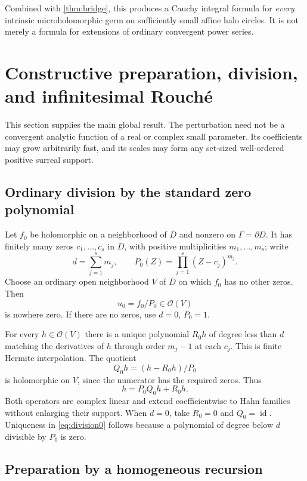 \documentclass[11pt,letterpaper]{article}
\numberwithin{equation}{section}
\theoremstyle{definition}
\theoremstyle{remark}
\newcommand{\OO}{\mathcal O}
\DeclareMathOperator{\id}{id}
\begin{document}
Combined with \cref{thm:bridge}, this produces a Cauchy integral formula
for \emph{every} intrinsic microholomorphic germ on sufficiently small
affine halo circles. It is not merely a formula for extensions of
ordinary convergent power series.

\section{Constructive preparation, division, and infinitesimal Rouch\'e}
\label{sec:preparation}

This section supplies the main global result. The perturbation need not
be a convergent analytic function of a real or complex small parameter.
Its coefficients may grow arbitrarily fast, and its scales may form any
set-sized well-ordered positive surreal support.

\subsection{Ordinary division by the standard zero polynomial}

Let $f_0$ be holomorphic on a neighborhood of $\overline D$ and nonzero
on $\Gamma=\partial D$. It has finitely many zeros $c_1,\ldots,c_s$
in $D$, with positive multiplicities $m_1,\ldots,m_s$; write
\[
 d=\sum_{j=1}^s m_j,\qquad
 P_0(Z)=\prod_{j=1}^s(Z-c_j)^{m_j}.
\]
Choose an ordinary open neighborhood $V$ of $\overline D$ on which
$f_0$ has no other zeros. Then
\[
 u_0=f_0/P_0\in\OO(V)
\]
is nowhere zero. If there are no zeros, use $d=0$, $P_0=1$.

For every $h\in\OO(V)$ there is a unique polynomial $R_0h$ of degree
less than $d$ matching the derivatives of $h$ through order $m_j-1$
at each $c_j$. This is finite Hermite interpolation. The quotient
\[
 Q_0h=(h-R_0h)/P_0
\]
is holomorphic on $V$, since the numerator has the required zeros.
Thus
\begin{equation}\label{eq:division0}
 h=P_0Q_0h+R_0h.
\end{equation}
Both operators are complex linear and extend coefficientwise to Hahn
families without enlarging their support. When $d=0$, take $R_0=0$
and $Q_0=\id$. Uniqueness in \eqref{eq:division0} follows because a
polynomial of degree below $d$ divisible by $P_0$ is zero.

\subsection{Preparation by a homogeneous recursion}
\end{document}
